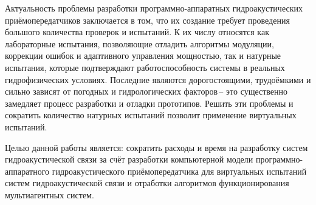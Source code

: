 \documentclass[
    numbers=section,
    document-code={ВКРБ--09.03.04--10.19--XX--26--81}
]{../latex/fqw}
\begin{document}
    Актуальность проблемы разработки программно-аппаратных гидроакустических приёмопередатчиков заключается в том,
    что их создание требует проведения большого количества проверок и испытаний.
    К их числу относятся как лабораторные испытания, позволяющие отладить алгоритмы модуляции, коррекции ошибок
    и адаптивного управления мощностью, так и натурные испытания, которые подтверждают работоспособность системы
    в реальных гидрофизических условиях.
    Последние являются дорогостоящими, трудоёмкими и сильно зависят от погодных и гидрологических факторов\,-- это
    существенно замедляет процесс разработки и отладки прототипов.
    Решить эти проблемы и сократить количество натурных испытаний позволит
    применение виртуальных испытаний\nbspace\cite{s.-m.kimImplementationRealtimeTimevarying2023}.

    Целью данной работы является: сократить расходы и время на разработку систем гидроакустической связи за счёт
    разработки компьютерной модели программно-аппаратного гидроакустического приёмопередатчика для виртуальных испытаний
    систем гидроакустической связи и отработки алгоритмов функционирования мультиагентных систем.
\end{document}
